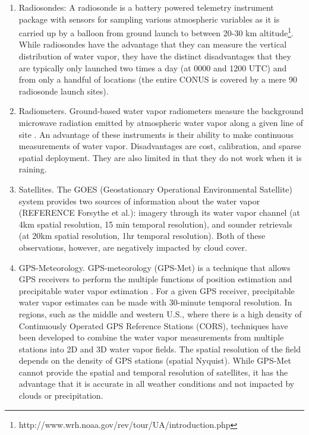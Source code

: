\documentclass[proposal]{umassthesis}
\begin{document}
\begin{enumerate}
\item Radiosondes: A radiosonde is a battery powered telemetry instrument package with sensors for sampling various atmospheric variables as it is carried up by a balloon from ground launch to between 20-30 km altitude\footnote{http://www.wrh.noaa.gov/rev/tour/UA/introduction.php}. While radiosondes have the advantage that they can measure the vertical distribution of water vapor, they have the distinct disadvantages that they are typically only launched two times a day (at 0000 and 1200 UTC) and from only a handful of locations (the entire CONUS is covered by a mere 90 radiosonde launch sites).
\item Radiometers. Ground-based water vapor radiometers measure the background microwave radiation emitted by atmospheric water vapor along a given line of site \cite{batelaan1976development}. An advantage of these instruments is their ability to make continuous measurements of water vapor. Disadvantages are cost, calibration, and sparse spatial deployment. They are also limited in that they do not work when it is raining.
\item Satellites. The GOES (Geostationary Operational Environmental Satellite) system provides two sources of information about the water vapor (REFERENCE Forsythe et al.): imagery through its water vapor channel (at 4km spatial resolution, 15 min temporal resolution), and sounder retrievals (at 20km spatial resolution, 1hr temporal resolution). Both of these observations, however, are negatively impacted by cloud cover.
 \item GPS-Meteorology. GPS-meteorology (GPS-Met) is a technique that allows GPS receivers to perform the multiple functions of position estimation and precipitable water vapor estimation \cite{bevis1992gps}. For a given GPS receiver, precipitable water vapor estimates can be made with 30-minute temporal resolution. In regions, such as the middle and western U.S., where there is a high density of Continuously Operated GPS Reference Stations (CORS), techniques have been developed to combine the water vapor measurements from multiple stations into 2D and 3D water vapor fields. The spatial resolution of the field depends on the density of GPS stations (spatial Nyquist). While GPS-Met cannot provide the spatial and temporal resolution of satellites, it has the advantage that it is accurate in all weather conditions and not impacted by clouds or precipitation.
\end{enumerate}
\end{document}
